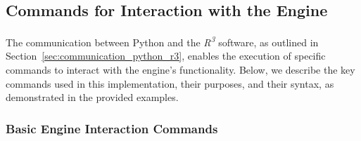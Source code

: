 \subsection{Commands for Interaction with the Engine}
\label{subsec:engine_commands}

\noindent The communication between Python and the \textit{R\textsuperscript{3}} software, as outlined in Section~\ref{sec:communication_python_r3}, enables the execution of specific commands to interact with the engine's functionality. Below, we describe the key commands used in this implementation, their purposes, and their syntax, as demonstrated in the provided examples.

\subsubsection{Basic Engine Interaction Commands}
